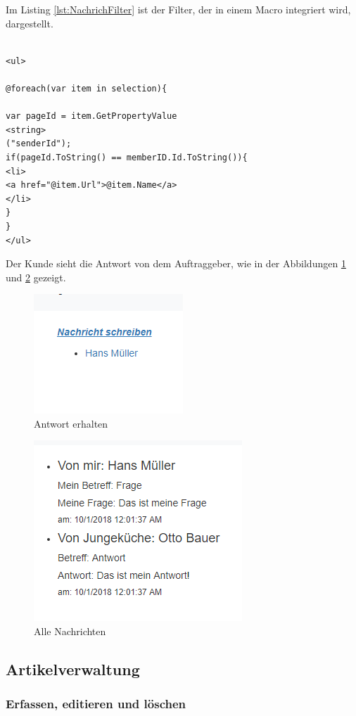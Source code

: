 \pagebreak

Im Listing \ref{lst:NachrichFilter} ist der Filter, der in einem Macro integriert wird, dargestellt.

\begin{lstlisting}[caption={NachrichFilter}, label=lst:NachrichFilter]

<ul>

@foreach(var item in selection){

var pageId = item.GetPropertyValue
<string>
("senderId");
if(pageId.ToString() == memberID.Id.ToString()){
<li>
<a href="@item.Url">@item.Name</a>
</li>
}
}
</ul>
\end{lstlisting}

Der Kunde sieht die Antwort von dem Auftraggeber, wie in der Abbildungen \ref{fig:bekommen} und \ref{fig:alleNachrichten} gezeigt.
\begin{figure}[h]
	\centering
	\includegraphics[width=0.3\linewidth]{Graphics/nachrichtBekomm.png}
	\caption[Nachricht]{Antwort erhalten}
	\label{fig:bekommen}
\end{figure}

\begin{figure}[h]
	\centering
	\includegraphics[width=0.3\linewidth]{Graphics/dialog.png}
	\caption[Nachricht]{Alle Nachrichten}
	\label{fig:alleNachrichten}
\end{figure}
 
 \pagebreak
 
\subsection{Artikelverwaltung}

\subsubsection{Erfassen, editieren und löschen}

